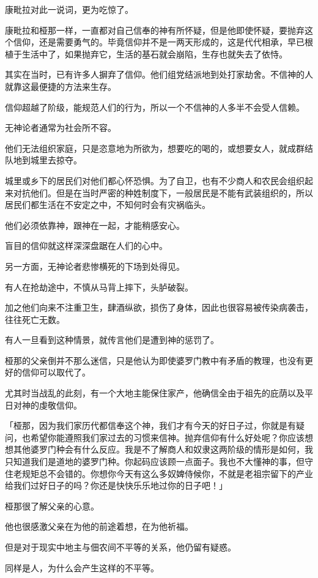 \documentclass[twoside,openany]{book}
\begin{document}
康毗拉对此一说词，更为吃惊了。

康毗拉和桠那一样，一直都对自己信奉的神有所怀疑，但是他即使怀疑，要抛弃这个信仰，还是需要勇气的。毕竟信仰并不是一两天形成的，这是代代相承，早已根植于生活中了，如果抛弃它，生活的基石就会崩陷，生存也就失去了依恃。

其实在当时，已有许多人摒弃了信仰。他们组党结派地到处打家劫舍。不信神的人就靠这最便捷的方法来生存。

信仰超越了阶级，能规范人们的行为，所以一个不信神的人多半不会受人信赖。

无神论者通常为社会所不容。

他们无法组织家庭，只是恣意地为所欲为，想要吃的喝的，或想要女人，就成群结队地到城里去掠夺。

城里或乡下的居民们对他们都心怀恐惧。为了自卫，也有不少商人和农民会组织起来对抗他们。但是在当时严密的种姓制度下，一般居民是不能有武装组织的，所以居民们都生活在不安定之中，不知何时会有灾祸临头。

他们必须依靠神，跟神在一起，才能稍感安心。

盲目的信仰就这样深深盘踞在人们的心中。

另一方面，无神论者悲惨横死的下场到处得见。

有人在抢劫途中，不慎从马背上摔下，头胪破裂。

加之他们向来不注重卫生，肆酒纵欲，损伤了身体，因此也很容易被传染病袭击，往往死亡无数。

有人一旦看到这种情景，就传言他们是遭到神的惩罚了。

桠那的父亲倒并不那么迷信，只是他认为即使婆罗门教中有矛盾的教理，也没有更好的信仰可以取代了。

尤其时当战乱的此刻，有一个大地主能保住家产，他确信全由于祖先的庇荫以及平日对神的虔敬信仰。

「桠那，因为我们家历代都信奉这个神，我们才有今天的好日子过，你就是有疑问，也希望你能遵照我们家过去的习惯来信神。抛弃信仰有什么好处呢？你应该想想其他婆罗门种会有什么反应。我是不了解商人和奴隶这两阶级的情形是如何，我只知道我们是道地的婆罗门种。你起码应该顾一点面子。我也不大懂神的事，但守住老规矩总不会错的。你想你今天有这么多奴婢侍候你，不就是老祖宗留下的产业给我们过好日子的吗？你还是快快乐乐地过你的日子吧！」

桠那很了解父亲的心意。

他也很感激父亲在为他的前途着想，在为他祈福。

但是对于现实中地主与佃农间不平等的关系，他仍留有疑惑。

同样是人，为什么会产生这样的不平等。
\end{document}

